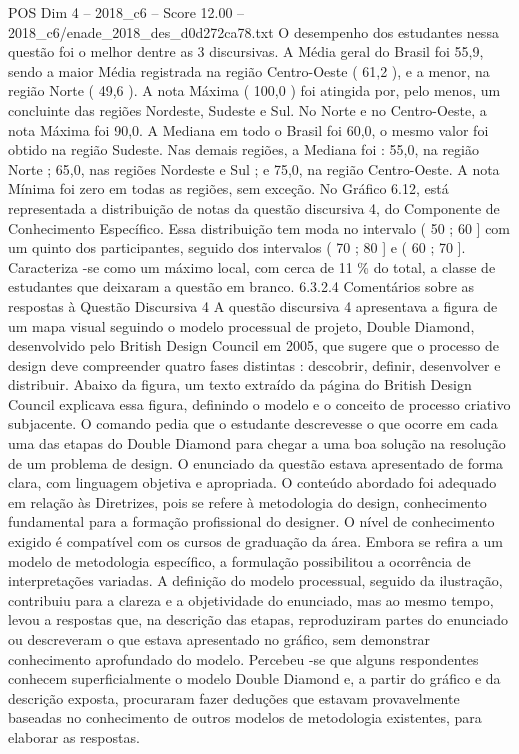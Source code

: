 \begin{textsample}{POS Dim 4 – 2018\_c6 – Score 12.00 – 2018\_c6/enade\_2018\_des\_d0d272ca78.txt}
O desempenho dos estudantes nessa questão foi o melhor dentre as 3 discursivas.
A Média geral do Brasil foi 55,9, sendo a maior Média registrada na região Centro-Oeste ( 61,2 ), e a menor, na região Norte ( 49,6 ).
A nota Máxima ( 100,0 ) foi atingida por, pelo menos, um concluinte das regiões Nordeste, Sudeste e Sul.
No Norte e no Centro-Oeste, a nota Máxima foi 90,0.
A Mediana em todo o Brasil foi 60,0, o mesmo valor foi obtido na região Sudeste.
Nas demais regiões, a Mediana foi : 55,0, na região Norte ; 65,0, nas regiões Nordeste e Sul ; e 75,0, na região Centro-Oeste.
A nota Mínima foi zero em todas as regiões, sem exceção.
No Gráfico 6.12, está representada a distribuição de notas da questão discursiva 4, do Componente de Conhecimento Específico.
Essa distribuição tem moda no intervalo ( 50 ; 60 ] com um quinto dos participantes, seguido dos intervalos ( 70 ; 80 ] e ( 60 ; 70 ].
Caracteriza -se como um máximo local, com cerca de 11 \% do total, a classe de estudantes que deixaram a questão em branco. 6.3.2.4 Comentários sobre as respostas à Questão Discursiva 4 A questão discursiva 4 apresentava a figura de um mapa visual seguindo o modelo processual de projeto, Double Diamond, desenvolvido pelo British Design Council em 2005, que sugere que o processo de design deve compreender quatro fases distintas : descobrir, definir, desenvolver e distribuir.
Abaixo da figura, um texto extraído da página do British Design Council explicava essa figura, definindo o modelo e o conceito de processo criativo subjacente.
O comando pedia que o estudante descrevesse o que ocorre em cada uma das etapas do Double Diamond para chegar a uma boa solução na resolução de um problema de design.
O enunciado da questão estava apresentado de forma clara, com linguagem objetiva e apropriada.
O conteúdo abordado foi adequado em relação às Diretrizes, pois se refere à metodologia do design, conhecimento fundamental para a formação profissional do designer.
O nível de conhecimento exigido é compatível com os cursos de graduação da área.
Embora se refira a um modelo de metodologia específico, a formulação possibilitou a ocorrência de interpretações variadas.
A definição do modelo processual, seguido da ilustração, contribuiu para a clareza e a objetividade do enunciado, mas ao mesmo tempo, levou a respostas que, na descrição das etapas, reproduziram partes do enunciado ou descreveram o que estava apresentado no gráfico, sem demonstrar conhecimento aprofundado do modelo.
Percebeu -se que alguns respondentes conhecem superficialmente o modelo Double Diamond e, a partir do gráfico e da descrição exposta, procuraram fazer deduções que estavam provavelmente baseadas no conhecimento de outros modelos de metodologia existentes, para elaborar as respostas.

\end{textsample}
